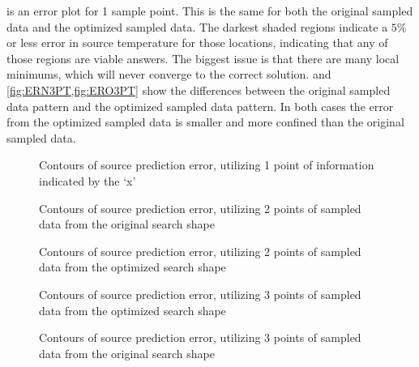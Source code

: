 \documentclass[preprint,12pt]{elsarticle}
\begin{document}
 is an error plot for 1 sample point.  This is the same for both the original sampled data and the optimized sampled data.  The darkest shaded regions indicate a $5\%$ or less error in source temperature for those locations, indicating that any of those regions are viable answers.  The biggest issue is that there are many local minimums, which will never converge to the correct solution.   and \cref{fig:ERN3PT,fig:ERO3PT} show the differences between the original sampled data pattern and the optimized sampled data pattern.  In both cases the error from the optimized sampled data is smaller and more confined than the original sampled data.  
%
\begin{figure}[!htbp]
	\centering
	\setlength\figureheight{4cm} 
	\setlength\figurewidth{4cm}
	
	\caption{Contours of source prediction error, utilizing 1 point of information indicated by the `x'}
	\label{fig:ERO1PT}
\end{figure}
\begin{figure}[!htbp]
	\centering
	\setlength\figureheight{4cm} 
	\setlength\figurewidth{4cm}
	
	\caption{Contours of source prediction error, utilizing 2 points of sampled data from the original search shape}
	\label{fig:ERN2PT}
\end{figure}
\begin{figure}[!htbp]
	\centering
	\setlength\figureheight{4cm} 
	\setlength\figurewidth{4cm}
	
	\caption{Contours of source prediction error, utilizing 2 points of sampled data from the optimized search shape}
	\label{fig:ERO2PT}
\end{figure}
\begin{figure}[!htbp]
	\centering
	\setlength\figureheight{4cm} 
	\setlength\figurewidth{4cm}
	
	\caption{Contours of source prediction error, utilizing 3 points of sampled data from the optimized search shape}
	\label{fig:ERO3PT}
\end{figure}
\begin{figure}[!htbp]
	\centering
	\setlength\figureheight{4cm} 
	\setlength\figurewidth{4cm}
	
	\caption{Contours of source prediction error, utilizing 3 points of sampled data from the original search shape}
	\label{fig:ERN3PT}
\end{figure}
\end{document}
